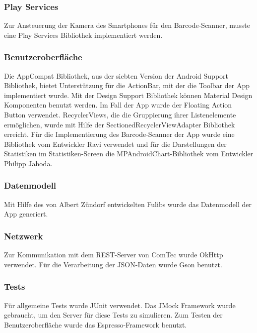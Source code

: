 \subsubsection{Play Services} \label{subsubsec:play-service-libraries}
Zur Ansteuerung der Kamera des Smartphones für den Barcode-Scanner, musste eine Play Services Bibliothek implementiert werden.

\subsubsection{Benutzeroberfläche} \label{subsubsec:ui-libraries}
Die AppCompat Bibliothek, aus der siebten Version der Android Support Bibliothek, bietet Unterstützung für die ActionBar, mit der die Toolbar der App implementiert wurde.
Mit der Design Support Bibliothek können Material Design Komponenten benutzt werden.
Im Fall der App wurde der Floating Action Button verwendet.
RecyclerViews, die die Gruppierung ihrer Listenelemente ermöglichen, wurde mit Hilfe der SectionedRecyclerViewAdapter Bibliothek erreicht.
Für die Implementierung des Barcode-Scanner der App wurde eine Bibliothek vom Entwickler Ravi verwendet und für die Darstellungen der Statistiken im Statistiken-Screen die MPAndroidChart-Bibliothek vom Entwickler Philipp Jahoda.

\subsubsection{Datenmodell} \label{subsubsec:model-libraries}
Mit Hilfe des von Albert Zündorf entwickelten Fulibs wurde das Datenmodell der App generiert.

\subsubsection{Netzwerk} \label{subsubsec:network-libraries}
Zur Kommunikation mit dem REST-Server von ComTec wurde OkHttp verwendet.
Für die Verarbeitung der JSON-Daten wurde Gson benutzt.

\subsubsection{Tests} \label{subsubsec:tests-libraries}
Für allgemeine Tests wurde JUnit verwendet.
Das JMock Framework wurde gebraucht, um den Server für diese Tests zu simulieren.
Zum Testen der Benutzeroberfläche wurde das Espresso-Framework benutzt.
